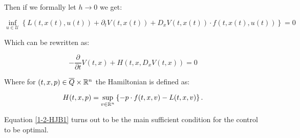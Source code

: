Then if we formally let $h\to0$ we get:

\[\inf_{u\in\mathcal{U}}\left\{L(t,x(t),u(t)) + \partial_tV(t,x(t)) + D_xV(t,x(t))\cdot f(t,x(t),u(t))\right\}=0\]

Which can be rewritten as:

\begin{equation}\label{1-2-HJB1}
    -\frac{\partial}{\partial t}V(t,x) + H(t,x,D_xV(t,x))=0
\end{equation}

Where for $(t,x,p)\in \overline{Q}\times\mathbb{R}^n$ the Hamiltonian is defined as:

\begin{equation}\label{1-2-Hamiltonian1}
    H(t,x,p) = \sup_{v\in\mathbb{R}^n}\left\{-p\cdot f(t,x,v) - L(t,x,v)\right\}.
\end{equation}

Equation \ref{1-2-HJB1} turns out to be the main sufficient condition for the control to be optimal.

